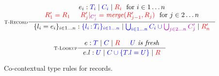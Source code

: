 \begin{figure}[t]
  \centering
  {
  \begin{gather*}
      \inference[\rulename{T-Record}]
        {\cojudge {e_i} {T_i} {C_i} {\reqs_i} \ \ \text{for } i \in 1 \ldots n \\
         \ctxcolor{\reqs'_1 = \reqs_1} &
         \ctxcolor{\reqs'_{j}|_{\typectxcolor{C'_{j}}} = \reqmerge{\reqs'_{j-1}}{\reqs_{j}}} \ \  \text{for } j \in 2 \ldots n}
        {\cojudge {\record{l_i}{e_i}{i}{1}{n}} {\TRecord{l_i}{T_i}{i}{1}{n}} {\bigcup_{i \in 1 \ldots n} C_i \cup \typectxcolor{\bigcup_{j \in 2 \ldots n} C'_j}} {\reqs'_n}}
\\[2ex]
      \inference[\rulename{T-Lookup}]
        {\cojudge {e} {T} {C} {\reqs} &
         \fresh{U}}
        {\cojudge {e.l} {U} {C \cup \{T.l = U\}} {\reqs}}
\end{gather*}
}
  \caption{Co-contextual type rules for records.}
  \label{fig:co-pcf-records}
\end{figure}

